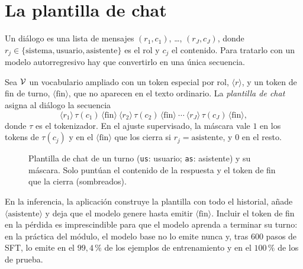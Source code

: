 \section{La plantilla de chat}

Un diálogo es una lista de mensajes $(r_1,c_1)$, \dots, $(r_J,c_J)$, donde $r_j\in\{\text{sistema},\text{usuario},\text{asistente}\}$ es el rol y $c_j$ el contenido. Para tratarlo con un modelo autorregresivo hay que convertirlo en una única secuencia.

\begin{definicion}\label{def:plantilla}
Sea $\mathcal{V}$ un vocabulario ampliado con un token especial por rol, $\langle r\rangle$, y un token de fin de turno, $\langle\mathrm{fin}\rangle$, que no aparecen en el texto ordinario. La \emph{plantilla de chat} asigna al diálogo la secuencia
\[
\langle r_1\rangle\,\tau(c_1)\,\langle\mathrm{fin}\rangle\ \langle r_2\rangle\,\tau(c_2)\,\langle\mathrm{fin}\rangle\ \cdots\ \langle r_J\rangle\,\tau(c_J)\,\langle\mathrm{fin}\rangle,
\]
donde $\tau$ es el tokenizador. En el ajuste supervisado, la máscara vale $1$ en los tokens de $\tau(c_j)$ y en el $\langle\mathrm{fin}\rangle$ que los cierra si $r_j=\text{asistente}$, y $0$ en el resto.
\end{definicion}

\begin{figure}[h]
\centering
{}
\caption{Plantilla de chat de un turno (\texttt{us}: usuario; \texttt{as}: asistente) y su máscara. Solo puntúan el contenido de la respuesta y el token de fin que la cierra (sombreados).}
\label{fig:plantilla}
\end{figure}

En la inferencia, la aplicación construye la plantilla con todo el historial, añade $\langle\text{asistente}\rangle$ y deja que el modelo genere hasta emitir $\langle\mathrm{fin}\rangle$. Incluir el token de fin en la pérdida es imprescindible para que el modelo aprenda a terminar su turno: en la práctica del módulo, el modelo base no lo emite nunca y, tras 600 pasos de SFT, lo emite en el $99{,}4\,\%$ de los ejemplos de entrenamiento y en el $100\,\%$ de los de prueba.

